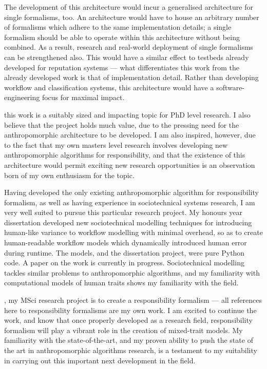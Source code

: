 The development of this architecture would incur a generalised architecture for single formalisms, too. An architecture would have to house an arbitrary number of formalisms which adhere to the same implementation details; a single formalism should be able to operate within this architecture without being combined. As a result, research and real-world deployment of single formalisms can be strengthened also. This would have a similar effect to testbeds already developed for reputation systems\cite{Chandrasekaran2011} --- what differentiates this work from the already developed work is that of implementation detail. Rather than developing workflow and classification systems, this architecture would have a software-engineering focus for maximal impact.

\bigskip %

 this work is a suitably sized and impacting topic for PhD level research. I also believe that the project holds much value, due to the pressing need for the anthropomorphic architecture to be developed. I am also inspired, however, due to the fact that my own masters level research involves developing new anthropomorphic algorithms for responsibility, and that the existence of this architecture would permit exciting new research opportunities is an observation born of my own enthusiasm for the topic. \par

Having developed the only existing anthropomorphic algorithm for responsibility formalism, as well as having experience in sociotechnical systems research, I am very well suited to pursue this particular research project. My honours year dissertation developed new sociotechnical modelling techniques for introducing human-like variance to workflow modelling with minimal overhead, so as to create human-readable workflow models which dynamically introduced human error during runtime. The models, and the dissertation project, were pure Python code. A paper on the work is currently in progress.\cite{wallis_2016_b} Sociotechnical modelling tackles similar problems to anthropomorphic algorithms, and my familiarity with computational models of human traits shows my familiarity with the field.\par

, my MSci research project is to create a responsibility formalism --- all references here to responsibility formalisms are my own work. I am excited to continue the work, and know that once properly developed as a research field, responsibility formalism will play a vibrant role in the creation of mixed-trait models. My familiarity with the state-of-the-art, and my proven ability to push the state of the art in anthropomorphic algorithms research, is a testament to my suitability in carrying out this important next development in the field.\par


